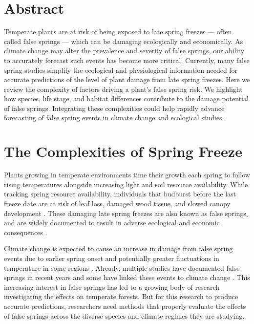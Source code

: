 \documentclass{article}\usepackage[]{graphicx}\usepackage[]{color}
\begin{document}
\section*{Abstract}
Temperate plants are at risk of being exposed to late spring freezes --- often called false springs --- which can be damaging ecologically and economically. As climate change may alter the prevalence and severity of false springs, our ability to accurately forecast such events has become more critical. Currently, many false spring studies simplify the ecological and physiological information needed for accurate predictions of the level of plant damage from late spring freezes. Here we review the complexity of factors driving a plant's false spring risk. We highlight how species, life stage, and habitat differences contribute to the damage potential of false springs. %
Integrating these complexities could help rapidly advance forecasting of false spring events in climate change and ecological studies.

\section*{The Complexities of Spring Freeze}

Plants growing in temperate environments time their growth each spring to follow rising temperatures alongside increasing light and soil resource availability. While tracking spring resource availability, individuals that budburst before the last freeze date are at risk of leaf loss, damaged wood tissue, and slowed canopy development \citep{Gu2008, Hufkens2012}. These damaging late spring freezes are also known as false springs, and are widely documented to result in adverse ecological and economic consequences \citep{Knudson2012, Ault2013}.

Climate change is expected to cause an increase in damage from false spring events due to earlier spring onset and potentially greater fluctuations in temperature in some regions \citep{Inouye2008, Martin2010}. Already, multiple studies have documented false springs in recent years \citep{Gu2008, Augspurger2009, Augspurger2013, Menzel2015} and some have linked these events to climate change \citep{Ault2013, Allstadt2015, Muffler2016, Xin2016, Vitra2017}. This increasing interest in false springs has led to a growing body of research investigating the effects on temperate forests. But for this research to produce accurate predictions, researchers need methods that properly evaluate the effects of false springs across the diverse species and climate regimes they are studying. 
\end{document}
